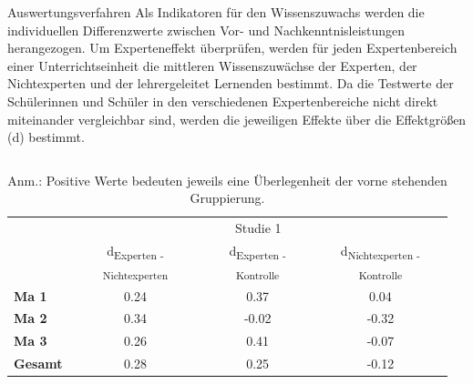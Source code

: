 \documentclass[final]{beamer}
\newlength{\onecolwid}
\newlength{\twocolwid}
\begin{document}
\begin{frame}[t]
\begin{columns}[t]
\begin{column}{\twocolwid}
\begin{alertblock}{Auswertungsverfahren}
Als Indikatoren für den Wissenszuwachs werden die individuellen Differenzwerte zwischen Vor- und Nachkenntnisleistungen herangezogen. Um Experteneffekt überprüfen, werden für jeden Expertenbereich einer Unterrichtseinheit die mittleren Wissenszuwächse der Experten, der Nichtexperten und der lehrergeleitet Lernenden bestimmt. Da die Testwerte der Schülerinnen und Schüler in den verschiedenen Expertenbereiche nicht direkt miteinander vergleichbar sind, werden die jeweiligen Effekte über die Effektgrößen (d) bestimmt.
\end{alertblock} 


\begin{columns}[t,totalwidth=\twocolwid] %
\begin{column}{\onecolwid} %


\begin{table}
\begin{tabular}{lccc}
\toprule 
 & \multicolumn{3}{c}{Studie 1} \\
\cmidrule{2-4}
 & d\textsubscript{Experten - Nichtexperten} & d\textsubscript{Experten - Kontrolle} & d\textsubscript{Nichtexperten - Kontrolle} \\
\midrule 
\textbf{Ma 1} & 0.24 & 0.37 & 0.04 \\
\textbf{Ma 2} & 0.34 & -0.02 & -0.32 \\
\textbf{Ma 3} & 0.26 & 0.41 & -0.07 \\
\midrule 
\textbf{Gesamt} & 0.28 & 0.25 & -0.12 \\
\bottomrule
\end{tabular}
{\caption*{Anm.: Positive Werte bedeuten jeweils eine Überlegenheit der vorne stehenden Gruppierung.}}
\end{table}


\end{column} %


\begin{column}{\onecolwid} %



\end{column}
\end{columns}
\end{column}
\end{columns}
\end{frame}
\end{document}
